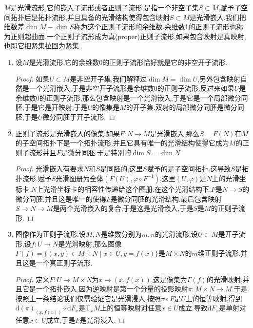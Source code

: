 $M$是光滑流形,它的嵌入子流形或者正则子流形,是指一个非空子集$S\subset M$,赋予子空间拓扑后是拓扑流形,并且具备的光滑结构使得包含映射$S\subset M$是光滑嵌入.我们把维数差$\dim M-\dim S$称为这个正则子流形的余维数.余维数1的正则子流形也称为正则超曲面.一个正则子流形成为真(proper)正则子流形,如果包含映射是真映射,也即它把紧集拉回为紧集.
\begin{enumerate}
	\item 设$M$是光滑流形,它的余维数0的正则子流形恰好就是它的非空开子流形.
	\begin{proof}
		
		如果$U\subset M$是非空开子集,我们解释过$\dim M=\dim U$,另外包含映射自然是一个光滑嵌入,于是非空开子流形是余维数0的正则子流形.反过来如果$U$是余维数0的正则子流形,那么包含映射是一个光滑嵌入,于是它是一个局部微分同胚,于是它是开映射,于是$U$的像集是$M$的开子集.双射的局部微分同胚是微分同胚,于是$U$微分同胚于开子流形.
	\end{proof}
    \item 正则子流形是光滑嵌入的像集.如果$F:N\to M$是光滑嵌入,那么$S=F(N)$在$M$的子空间拓扑下是一个拓扑流形,并且它具有唯一的光滑结构使得它成为$M$的正则子流形并且$F$是微分同胚.于是特别的$\dim S=\dim N$
    \begin{proof}
    	
    	光滑嵌入有要求$N$和$S$是同胚的,这里$S$赋予的是子空间拓扑,这导致$S$是拓扑流形.赋予$S$光滑图册为全体$(F(U),\varphi\circ F^{-1})$,这里$(U,\varphi)$是$N$上的光滑坐标卡.$N$上光滑坐标卡的相容性传递给这个图册.在这个光滑结构下,$F$是$N\to S$的微分同胚.并且这是唯一的使得$F$是微分同胚的光滑结构.最后包含映射$S\to N\to M$是两个光滑嵌入的复合,于是这是光滑嵌入,于是$S$是$M$的正则子流形.
    \end{proof}
    \item 图像作为正则子流形.设$M,N$是维数分别为$m,n$的光滑流形,设$U\subset M$是开子流形,设$f:U\to N$是光滑映射,那么图像$\Gamma(f)=\{(x,y)\in M\times N\mid x\in U,y=f(x)\}$是$M\times N$的$m$维正则子流形.并且这是一个真正则子流形.
    \begin{proof}
    	
    	定义$F:U\to M\times N$为$x\mapsto(x,f(x))$,这是像集为$\Gamma(f)$的光滑映射,并且它是一个拓扑嵌入,因为逆映射是第一个分量的投影映射$\pi:M\times N\to M$.于是按照上一条结论我们仅需验证它是光滑浸入.按照$\pi\circ F$是$U$上的恒等映射,得到$\mathrm{d}(\pi)_{(x,f(x))}\circ\mathrm{d}F_x$是$\mathrm{T}_xM$上的恒等映射对任意$x\in U$成立.导致$\mathrm{d}F_x$是单射对任意$x\in U$成立,于是$F$是光滑浸入.
    	
    	\qquad
    	

\end{proof}
\end{enumerate}
